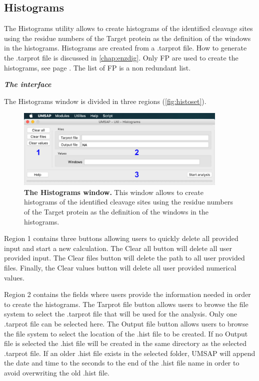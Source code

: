 \subsection{Histograms}
\label{subsec:histocut}
The Histograms utility allows to create histograms of the identified cleavage sites using the residue numbers of the Target protein as the definition of the windows in the histograms. Histograms are created from a .tarprot file. How to generate the .tarprot file is discussed in \autoref{chap:enzdig}. Only FP are used to create the histograms, see page \pageref{par:PIP}. The list of FP is a non redundant list. 

\textit{\textbf{The interface}}

The Histograms window is divided in three regions (\autoref{fig:histoset}).

\begin{figure}[h]
	\centering
	\includegraphics[width=0.9\textwidth]{./IMAGES/UTIL-HIST-WINDOW/util-histo.jpg}	    
	\caption[The Histograms window]{\textbf{The Histograms window.} This window allows to create histograms of the identified cleavage sites using the residue numbers of the Target protein as the definition of the windows in the histograms.} 
	\label{fig:histoset}
	\vspace{-5pt} 	
\end{figure}

Region \num{1} contains three buttons allowing users to quickly delete all provided input and start a new calculation. The Clear all button will delete all user provided input. The Clear files button will delete the path to all user provided files. Finally, the Clear values button will delete all user provided numerical values.

Region \num{2} contains the fields where users provide the information needed in order to create the histograms. The Tarprot file button allows users to browse the file system to select the .tarprot file that will be used for the analysis. Only one .tarprot file can be selected here. The Output file button allows users to browse the file system to select the location of the .hist file to be created. If no Output file is selected the .hist file will be created in the same directory as the selected .tarprot file. If an older .hist file exists in the selected folder, UMSAP will append the date and time to the seconds to the end of the .hist file name in order to avoid overwriting the old .hist file. 


